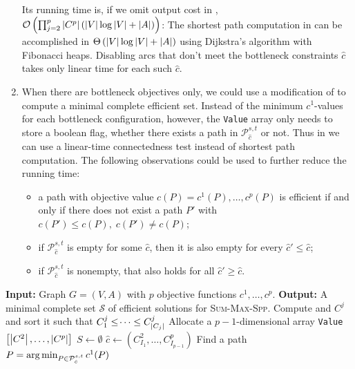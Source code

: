\documentclass[11pt,a4paper,parskip=half-]{scrartcl}
\begin{document}
\begin{solution}
\begin{enumerate}
	Its running time is, if we omit output cost in ,
	$\mathcal{O}\left( \prod_{j=2}^p \left\lvert C^p \right\rvert\left(\left\lvert V \right\rvert \log \left\lvert V \right\rvert + \left\lvert A \right\rvert\right)\right)$: The shortest path computation in 
	 can be accomplished in
	$\Theta\left(\left\lvert V \right\rvert \log \left\lvert V \right\rvert + \left\lvert A \right\rvert\right)$ using Dijkstra's algorithm
	with Fibonacci heaps. Disabling arcs that don't meet the bottleneck constraints
  $\hat c$ takes only linear time for each such $\hat c$. 
  \item When there are bottleneck objectives only, we could use a modification
  of  to compute a minimal complete efficient set.
  Instead of the minimum $c^1$-values for each bottleneck configuration,
  however, the \texttt{Value} array only needs to store a boolean flag,
  whether there exists a path in $\mathcal P^{s,t}_{\hat c}$ or not. Thus
  in  we can use a linear-time connectedness test
  instead of shortest path computation. 
  The following observations could be used to further reduce the running
  time:
  \begin{itemize}
    \item a path with objective
  value $c(P) = c^1(P),\dotsc,c^p(P)$ is efficient if and only if there does not
  exist a path $P'$ with $c(P') \leq c(P),\; c(P') \neq c(P)$;
    \item if $\mathcal P^{s,t}_{\hat c}$ is empty for some $\hat c$, then it is also empty
  for every $\hat c' \leq \hat c$;
    \item  if $\mathcal P^{s,t}_{\hat c}$ is nonempty, that also holds for all $\hat c' \geq \hat c$.
  \end{itemize}
  \end{enumerate}
\begin{algorithm}[H]
	\begin{algorithmic}[1]
	\State\textbf{Input:} Graph $G=(V,A)$ with $p$ objective functions $c^1,\dotsc,c^p$.
	\State\textbf{Output:} A minimal complete set $\mathcal S$ of efficient solutions for \textsc{Sum-Max-Spp}.
		\State Compute and $C^j$ and sort it such that $C^j_1 \leq \dotsi \leq C^j_{\left\lvert  C_j \right\rvert}$
	\EndFor
	\State Allocate a $p-1$-dimensional array
		\texttt{Value}$\left[\left\lvert C^2 \right\rvert,\dotsc,\left\lvert C^p \right\rvert\right]$
	\State $S \gets \emptyset$
	\label{line:forloop}
		\State $\hat c \gets (C^2_{I_1}, \dotsc, C^p_{I_{p-1}})$
		 \label{line:genpath}
		\State Find a path $P = \operatorname*{arg\,min}_{P \in \mathcal P^{s,t}_{\hat c}} c^1(P)$

\end{algorithmic}
\end{algorithm}
\end{solution}
\end{document}

